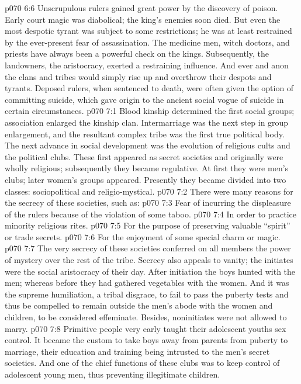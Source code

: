 \vs p070 6:6 \pc Unscrupulous rulers gained great power by the discovery of poison. Early court magic was diabolical; the king’s enemies soon died. But even the most despotic tyrant was subject to some restrictions; he was at least restrained by the ever\hyp{}present fear of assassination. The medicine men, witch doctors, and priests have always been a powerful check on the kings. Subsequently, the landowners, the aristocracy, exerted a restraining influence. And ever and anon the clans and tribes would simply rise up and overthrow their despots and tyrants. Deposed rulers, when sentenced to death, were often given the option of committing suicide, which gave origin to the ancient social vogue of suicide in certain circumstances.
\vs p070 7:1 Blood kinship determined the first social groups; association enlarged the kinship clan. Intermarriage was the next step in group enlargement, and the resultant complex tribe was the first true political body. The next advance in social development was the evolution of religious cults and the political clubs. These first appeared as secret societies and originally were wholly religious; subsequently they became regulative. At first they were men’s clubs; later women’s groups appeared. Presently they became divided into two classes: sociopolitical and religio\hyp{}mystical.
\vs p070 7:2 \pc There were many reasons for the secrecy of these societies, such as:
\vs p070 7:3 \bibnobreakspace Fear of incurring the displeasure of the rulers because of the violation of some taboo.
\vs p070 7:4 \bibnobreakspace In order to practice minority religious rites.
\vs p070 7:5 \bibnobreakspace For the purpose of preserving valuable “spirit” or trade secrets.
\vs p070 7:6 \bibnobreakspace For the enjoyment of some special charm or magic.
\vs p070 7:7 \pc The very secrecy of these societies conferred on all members the power of mystery over the rest of the tribe. Secrecy also appeals to vanity; the initiates were the social aristocracy of their day. After initiation the boys hunted with the men; whereas before they had gathered vegetables with the women. And it was the supreme humiliation, a tribal disgrace, to fail to pass the puberty tests and thus be compelled to remain outside the men’s abode with the women and children, to be considered effeminate. Besides, noninitiates were not allowed to marry.
\vs p070 7:8 \pc Primitive people very early taught their adolescent youths sex control. It became the custom to take boys away from parents from puberty to marriage, their education and training being intrusted to the men’s secret societies. And one of the chief functions of these clubs was to keep control of adolescent young men, thus preventing illegitimate children.
